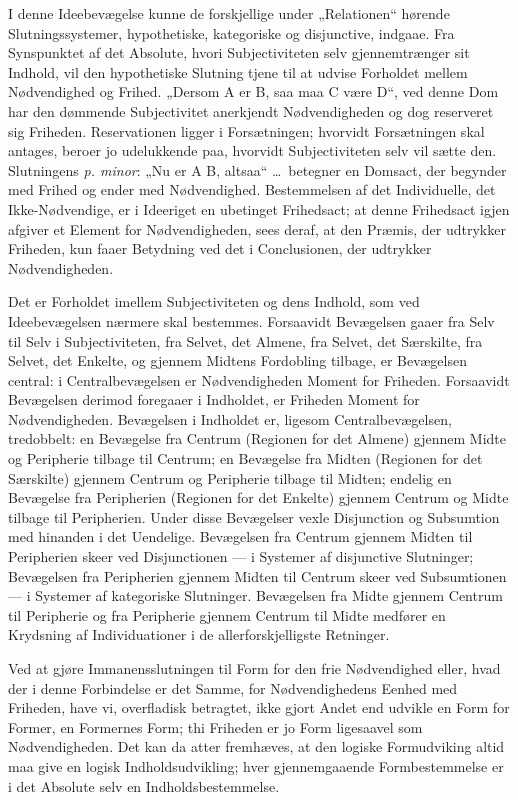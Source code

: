 \documentclass[12pt]{book}
\newcommand{\opage}[1]{\marginnote{\footnotesize\textit{[#1]}}}
\begin{document}
I denne Ideebevægelse kunne de forskjellige under „Relationen“ hørende Slutningssystemer, hypothetiske, kategoriske og disjunctive, indgaae. Fra Synspunktet af det Absolute,
\opage{367}hvori Subjectiviteten selv gjennemtrænger sit Indhold, vil den hypothetiske Slutning tjene til at udvise Forholdet mellem Nødvendighed og Frihed. „Dersom A er B, saa maa C være D“, ved denne Dom har den dømmende Subjectivitet anerkjendt Nødvendigheden og dog reserveret sig Friheden. Reservationen ligger i Forsætningen; hvorvidt Forsætningen skal antages, beroer jo udelukkende paa, hvorvidt Subjectiviteten selv vil sætte den. Slutningens \textit{p. minor}: „Nu er A B, altsaa“ \dots\ betegner en Domsact, der begynder med Frihed og ender med Nødvendighed. Bestemmelsen af det Individuelle, det Ikke-Nødvendige, er i Ideeriget en ubetinget Frihedsact; at denne Frihedsact igjen afgiver et Element for Nødvendigheden, sees deraf, at den Præmis, der udtrykker Friheden, kun faaer Betydning ved det i Conclusionen, der udtrykker Nødvendigheden.

Det er Forholdet imellem Subjectiviteten og dens Indhold, som ved Ideebevægelsen nærmere skal bestemmes. Forsaavidt Bevægelsen gaaer fra Selv til Selv i Subjectiviteten, fra Selvet, det Almene, fra Selvet, det Særskilte, fra Selvet, det Enkelte, og gjennem Midtens Fordobling tilbage, er Bevægelsen central: i Centralbevægelsen er Nødvendigheden Moment for Friheden. Forsaavidt Bevægelsen derimod foregaaer i Indholdet, er Friheden Moment for Nødvendigheden. Bevægelsen i Indholdet er, ligesom Centralbevægelsen, tredobbelt: en Bevægelse fra Centrum (Regionen for det Almene) gjennem Midte og Peripherie tilbage til Centrum; en Bevægelse fra Midten (Regionen for det Særskilte) gjennem Centrum og Peripherie tilbage til Midten; endelig en Bevægelse fra Peripherien (Regionen for det Enkelte) gjennem Centrum og Midte tilbage til Peripherien. Under disse Bevægelser vexle Disjunction og Subsumtion med hinanden i det Uendelige. Bevægelsen fra Centrum gjennem Midten til Peripherien skeer ved Disjunctionen --- i Systemer af disjunctive Slutninger; Bevægelsen fra Peripherien gjennem Midten til Centrum skeer ved Subsumtionen --- i Systemer af kategoriske Slutninger. Bevægelsen fra Midte
\opage{368}gjennem Centrum til Peripherie og fra Peripherie gjennem Centrum til Midte medfører en Krydsning af Individuationer i de allerforskjelligste Retninger.

Ved at gjøre Immanensslutningen til Form for den frie Nødvendighed eller, hvad der i denne Forbindelse er det Samme, for Nødvendighedens Eenhed med Friheden, have vi, overfladisk betragtet, ikke gjort Andet end udvikle en Form for Former, en Formernes Form; thi Friheden er jo Form ligesaavel som Nødvendigheden. Det kan da atter fremhæves, at den logiske Formudviking %
altid maa give en logisk Indholdsudvikling; hver gjennemgaaende Formbestemmelse er i det Absolute selv en Indholdsbestemmelse.
\end{document}
